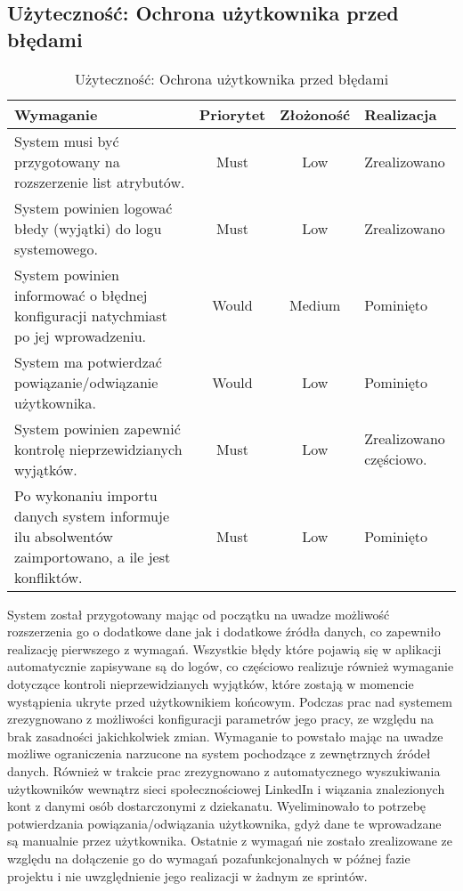 \subsection{Użyteczność: Ochrona użytkownika przed błędami}

\begin{table}[H]
\centering
\begin{tabular}{ | p{8cm} | c | c | p{2cm} | }
\hline
\textbf{Wymaganie} & \textbf{Priorytet} & \textbf{Złożoność} & \textbf{Realizacja} \\ \hline
System musi być przygotowany na rozszerzenie list atrybutów.
 & Must & Low & Zrealizowano \\ \hline
System powinien logować błedy (wyjątki) do logu systemowego.
 & Must & Low & Zrealizowano \\ \hline
 System powinien informować o błędnej konfiguracji natychmiast po jej wprowadzeniu. & Would & Medium & Pominięto \\ \hline
 System ma potwierdzać powiązanie/odwiązanie użytkownika. & Would & Low & Pominięto \\ \hline
 System powinien zapewnić kontrolę nieprzewidzianych wyjątków. & Must & Low & Zrealizowano częściowo. \\ \hline
 Po wykonaniu importu danych system informuje ilu absolwentów zaimportowano, a ile jest konfliktów. & Must & Low & Pominięto \\ \hline
\end{tabular}
\caption{Użyteczność: Ochrona użytkownika przed błędami}\label{tab:reqs}
\end{table}

System został przygotowany mając od początku na uwadze możliwość rozszerzenia go o  dodatkowe dane jak i dodatkowe źródła danych, co zapewniło realizację pierwszego z wymagań. Wszystkie błędy które pojawią się w aplikacji automatycznie zapisywane są do logów, co częściowo realizuje również wymaganie dotyczące kontroli nieprzewidzianych wyjątków, które zostają w momencie wystąpienia ukryte przed użytkownikiem końcowym. Podczas prac nad systemem zrezygnowano z możliwości konfiguracji parametrów jego pracy, ze względu na brak zasadności jakichkolwiek zmian. Wymaganie to powstało mając na uwadze możliwe ograniczenia narzucone na system pochodzące z zewnętrznych źródeł danych. Również w trakcie prac zrezygnowano z automatycznego wyszukiwania użytkowników wewnątrz sieci społecznościowej LinkedIn i wiązania znalezionych kont z danymi osób dostarczonymi z dziekanatu. Wyeliminowało to potrzebę potwierdzania powiązania/odwiązania użytkownika, gdyż dane te wprowadzane są manualnie przez użytkownika. Ostatnie z wymagań nie zostało zrealizowane ze względu na dołączenie go do wymagań pozafunkcjonalnych w późnej fazie projektu i nie uwzględnienie jego realizacji w żadnym ze sprintów.

